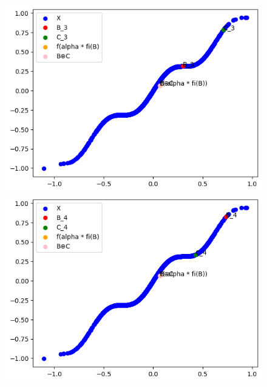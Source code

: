\documentclass{report}
\begin{document}
            \begin{figure}[h]
                \centering
                \begin{minipage}{0.5\textwidth}
                    \centering
                    \includegraphics[width=0.9\linewidth]{./images/alpha3.png}
                \end{minipage}%
                \begin{minipage}{0.5\textwidth}
                    \centering
                    \includegraphics[width=0.9\linewidth]{./images/alpha4.png}
                \end{minipage}
            \end{figure}
            
\end{document}
